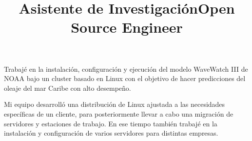 \begin{resume}
 \title{\textbf{Asistente de Investigaci\'{o}n}}
 \begin{position}
 Trabaj\'{e} en la instalaci\'{o}n, configuraci\'{o}n y ejecuci\'{o}n  del modelo WaveWatch III de NOAA bajo un cluster basado en Linux con el objetivo de hacer predicciones del oleaje del mar Caribe con alto desempe\~{n}o.

 \end{position}

\title{\textbf{Open Source Engineer}}
\begin{position}
Mi equipo desarroll\'{o} una distribuci\'{o}n de Linux ajustada a las
necesidades espec\'{i}ficas de un cliente, para posteriormente llevar
a cabo una  migraci\'{o}n de servidores y estaciones de trabajo. En ese tiempo tambi\'{e}n trabaj\'{e} en
la instalaci\'{o}n y configuraci\'{o}n de varios servidores para distintas empresas.
\end{position}
 \newline
 \newline
 \newline
 \newline
                                   

\end{resume}
